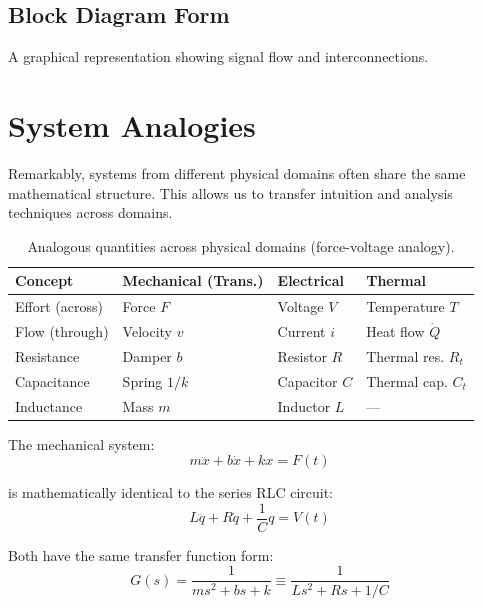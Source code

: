 \subsection{Block Diagram Form}

A graphical representation showing signal flow and interconnections.



\section{System Analogies}
\label{sec:analogies}

Remarkably, systems from different physical domains often share the same mathematical structure. This allows us to transfer intuition and analysis techniques across domains.

\begin{table}[htbp]
\centering
\begin{tabular}{llll}
\toprule
\textbf{Concept} & \textbf{Mechanical (Trans.)} & \textbf{Electrical} & \textbf{Thermal} \\
\midrule
Effort (across) & Force $F$ & Voltage $V$ & Temperature $T$ \\
Flow (through) & Velocity $v$ & Current $i$ & Heat flow $\dot{Q}$ \\
Resistance & Damper $b$ & Resistor $R$ & Thermal res. $R_t$ \\
Capacitance & Spring $1/k$ & Capacitor $C$ & Thermal cap. $C_t$ \\
Inductance & Mass $m$ & Inductor $L$ & --- \\
\bottomrule
\end{tabular}
\caption{Analogous quantities across physical domains (force-voltage analogy).}
\label{tab:analogies}
\end{table}

\begin{examplebox}[title=Example 1.1: Mass-Spring-Damper $\equiv$ RLC Circuit]
The mechanical system:
\begin{equation}
m\ddot{x} + b\dot{x} + kx = F(t)
\end{equation}

is mathematically identical to the series RLC circuit:
\begin{equation}
L\ddot{q} + R\dot{q} + \frac{1}{C}q = V(t)
\end{equation}

Both have the same transfer function form:
\begin{equation}
G(s) = \frac{1}{ms^2 + bs + k} \equiv \frac{1}{Ls^2 + Rs + 1/C}
\end{equation}
\end{examplebox}

